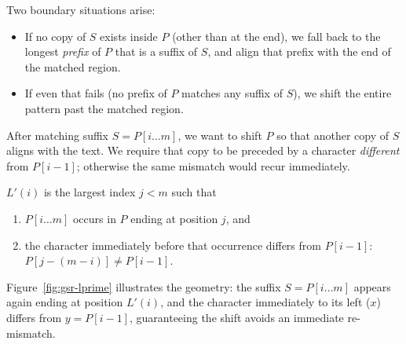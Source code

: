 Two boundary situations arise:
\begin{itemize}
  \item If no copy of $S$ exists inside $P$ (other than at the end), we fall
        back to the longest \emph{prefix} of $P$ that is a suffix of $S$,
        and align that prefix with the end of the matched region.
  \item If even that fails (no prefix of $P$ matches any suffix of $S$), we
        shift the entire pattern past the matched region.
\end{itemize}

After matching suffix $S = P[i\ldots m]$, we want to shift $P$ so that
another copy of $S$ aligns with the text.
We require that copy to be preceded by a character \emph{different} from
$P[i{-}1]$; otherwise the same mismatch would recur immediately.

\begin{definition}[$L'(i)$]
  $L'(i)$ is the largest index $j < m$ such that
  \begin{enumerate}
    \item $P[i\ldots m]$ occurs in $P$ ending at position $j$, and
    \item the character immediately before that occurrence differs from
          $P[i{-}1]$: $P[j - (m-i)] \neq P[i{-}1]$.
  \end{enumerate}
\end{definition}

Figure~\ref{fig:gsr-lprime} illustrates the geometry: the suffix $S = P[i\ldots m]$
appears again ending at position $L'(i)$, and the character immediately
to its left ($x$) differs from $y = P[i{-}1]$, guaranteeing the shift avoids
an immediate re-mismatch.

